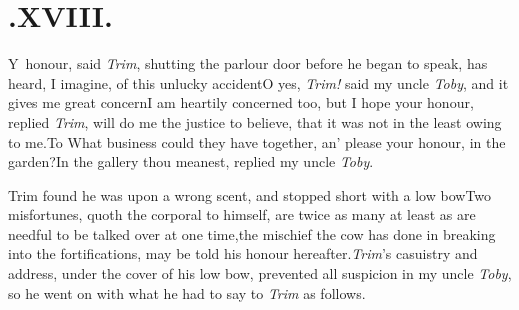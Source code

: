\documentclass{article}
\begin{document}
\medskip
\section{.\enspace XVIII.}

\lettrine{Y}{\,} honour, said \textit{Trim}, shutting\break
the parlour door before he began\break
to speak, has heard, I imagine, of this
unlucky accident\tsh O yes,
\textit{Trim!} said my uncle \textit{Toby}, and it gives me
great\break
concern\tsk I am heartily concerned too, but I hope your honour,
replied \textit{Trim},\break
will do me the justice to believe, that it was
not in the least owing to me.\tsh To
What business could they have together, an’ please your honour, in
the garden?\tsh In the gallery thou meanest, replied my
uncle \textit{Toby}.

Trim found he was upon a wrong scent, and stopped short with a
low bow\break\tsh Two misfortunes, quoth the corporal to
himself, are twice as many at least as are needful to be talked
over at one time,\break\tsh the mischief the cow has done in
breaking into the fortifications, may be told his honour
hereafter.\tsk \textit{Trim}’s casuistry and address,
under the cover of his low bow, prevented all suspicion in my uncle
\textit{Toby}, so he went on with what he had to say to \textit{Trim}
as follows.
\end{document}
